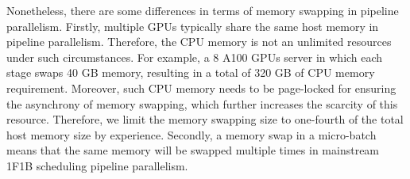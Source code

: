 Nonetheless, there are some differences in terms of memory swapping in pipeline parallelism.
Firstly, multiple GPUs typically share the same host memory in pipeline parallelism.
Therefore, the CPU memory is not an unlimited resources under such circumstances.
For example, a 8 A100 GPUs server in which each stage swaps 40 GB memory,
resulting in a total of 320 GB of CPU memory requirement.
Moreover, such CPU memory needs to be page-locked
for ensuring the asynchrony of memory swapping,
which further increases the scarcity of this resource.
Therefore, we limit the memory swapping size to one-fourth
of the total host memory size by experience.
Secondly, a memory swap in a micro-batch means that
the same memory will be swapped multiple times
in mainstream 1F1B scheduling pipeline parallelism.

